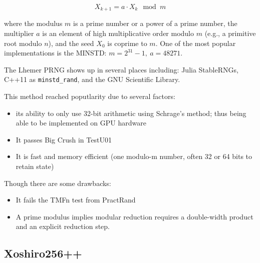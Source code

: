 \documentclass{article}
\begin{document}
            \begin{equation*}
                X_{k + 1} = a \cdot X_k \mod m
            \end{equation*}

            where the modulus $m$ is a prime number or a power of a prime number, the multiplier $a$ is an element of high multiplicative order modulo $m$ (e.g., a primitive root modulo $n$), and the seed $X_0$ is coprime to $m$.  One of the most popular implementations is the MINSTD: $m = 2^{31} - 1,\ a = 48271$.

            The Lhemer PRNG shows up in several places including: Julia StableRNGs\cite{StableRNGs}, C++11 as \verb|minstd_rand|, and the GNU Scientific Library\cite{GNUSciLib}.

            This method reached poputlarity due to several factors:
            
            \begin{itemize}
                \item its ability to only use 32-bit arithmetic using Schrage's method; thus being able to be implemented on GPU hardware
                \item It passes Big Crush in TestU01\cite{TestU01}
                \item It is fast and memory efficient (one modulo-m number, often 32 or 64 bits to retain state)
            \end{itemize}

            Though there are some drawbacks:

            \begin{itemize}
                \item It fails the TMFn test from PractRand\cite{Practrand}
                \item A prime modulus implies modular reduction requires a double-width product and an explicit reduction step.
            \end{itemize}

        \subsection*{Xoshiro256++}
\end{document}
